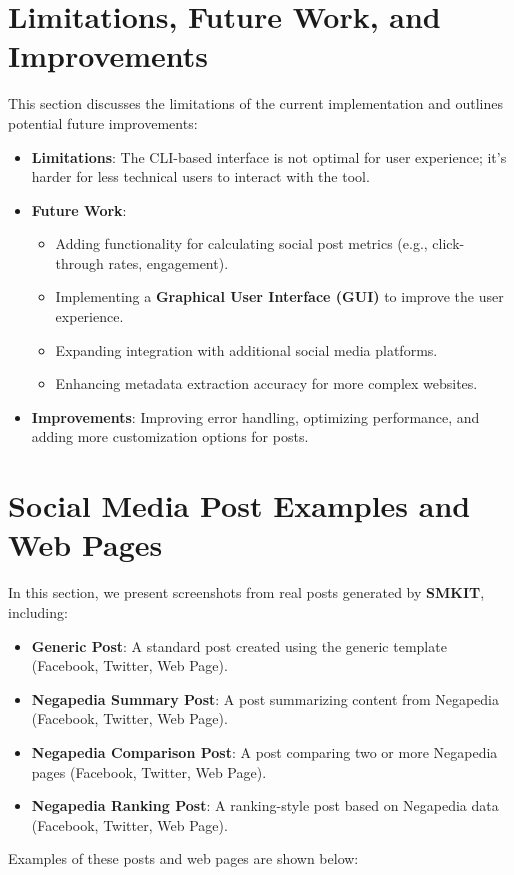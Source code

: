 \section{Limitations, Future Work, and Improvements}
\label{sec:limitations_future_work_improvements}
This section discusses the limitations of the current implementation and outlines potential future improvements:
\begin{itemize}
    \item \textbf{Limitations}: The CLI-based interface is not optimal for user experience; it’s harder for less technical users to interact with the tool.
    \item \textbf{Future Work}: 
    \begin{itemize}
        \item Adding functionality for calculating social post metrics (e.g., click-through rates, engagement).
        \item Implementing a \textbf{Graphical User Interface (GUI)} to improve the user experience.
        \item Expanding integration with additional social media platforms.
        \item Enhancing metadata extraction accuracy for more complex websites.
    \end{itemize}
    \item \textbf{Improvements}: Improving error handling, optimizing performance, and adding more customization options for posts.
\end{itemize}


\section{Social Media Post Examples and Web Pages}
\label{sec:social_media_post_examples}
In this section, we present screenshots from real posts generated by \textbf{SMKIT}, including:
\begin{itemize}
    \item \textbf{Generic Post}: A standard post created using the generic template (Facebook, Twitter, Web Page).
    \item \textbf{Negapedia Summary Post}: A post summarizing content from Negapedia (Facebook, Twitter, Web Page).
    \item \textbf{Negapedia Comparison Post}: A post comparing two or more Negapedia pages (Facebook, Twitter, Web Page).
    \item \textbf{Negapedia Ranking Post}: A ranking-style post based on Negapedia data (Facebook, Twitter, Web Page).
\end{itemize}
Examples of these posts and web pages are shown below:


